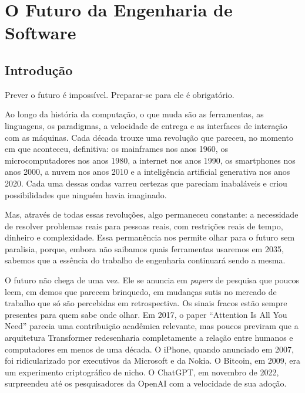 \chapter{O Futuro da Engenharia de Software}

\section{Introdução}

Prever o futuro é impossível. Preparar-se para ele é obrigatório.

Ao longo da história da computação, o que muda são as ferramentas, as
linguagens, os paradigmas, a velocidade de entrega e as interfaces de
interação com as máquinas. Cada década trouxe uma revolução que pareceu,
no momento em que aconteceu, definitiva: os mainframes nos anos 1960,
os microcomputadores nos anos 1980, a internet nos anos 1990, os
smartphones nos anos 2000, a nuvem nos anos 2010 e a inteligência
artificial generativa nos anos 2020. Cada uma dessas ondas varreu
certezas que pareciam inabaláveis e criou possibilidades que ninguém
havia imaginado.

Mas, através de todas essas revoluções, algo permaneceu
constante: a necessidade de resolver problemas reais para pessoas reais,
com restrições reais de tempo, dinheiro e complexidade. Essa
permanência nos permite olhar para o futuro sem paralisia, porque,
embora não saibamos quais ferramentas usaremos em 2035, sabemos que a
essência do trabalho de engenharia continuará sendo a mesma.

O futuro não chega de uma vez. Ele se anuncia em \textit{papers} de
pesquisa que poucos leem, em demos que parecem brinquedo, em mudanças
sutis no mercado de trabalho que só são percebidas em retrospectiva. Os
sinais fracos estão sempre presentes para quem sabe onde olhar. Em 2017,
o paper ``Attention Is All You Need'' parecia uma contribuição acadêmica
relevante, mas poucos previram que a arquitetura Transformer redesenharia
completamente a relação entre humanos e computadores em menos de uma
década. O iPhone, quando anunciado em 2007, foi ridicularizado por
executivos da Microsoft e da Nokia. O Bitcoin, em 2009, era um
experimento criptográfico de nicho. O ChatGPT, em novembro de 2022,
surpreendeu até os pesquisadores da OpenAI com a velocidade de sua
adoção.

